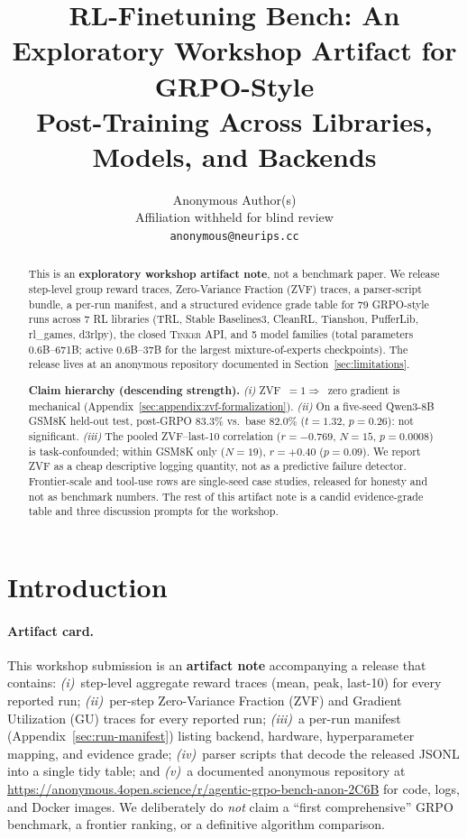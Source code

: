\documentclass{article}
\title{RL-Finetuning Bench: An Exploratory Workshop Artifact for GRPO-Style\\
Post-Training Across Libraries, Models, and Backends}
\author{Anonymous Author(s)\\
  Affiliation withheld for blind review\\
  \texttt{anonymous@neurips.cc}}
\newcommand{\tinker}{\textsc{Tinker}}
\begin{document}
\sloppy
{}
\hfuzz=2pt

\maketitle

\begin{abstract}
This is an \textbf{exploratory workshop artifact note}, not a benchmark paper.
We release step-level group reward traces, Zero-Variance Fraction (ZVF)
traces, a parser-script bundle, a per-run manifest, and a structured evidence
grade table for 79 GRPO-style runs across 7 RL libraries (TRL, Stable
Baselines3, CleanRL, Tianshou, PufferLib, rl\_games, d3rlpy), the closed
\tinker{} API, and 5 model families (total parameters 0.6B--671B; active
0.6B--37B for the largest mixture-of-experts checkpoints). The release lives
at an anonymous repository documented in
Section~\ref{sec:limitations}.

\textbf{Claim hierarchy (descending strength).}
\textit{(i)} ZVF~$=1\Rightarrow$~zero gradient is mechanical
(Appendix~\ref{sec:appendix:zvf-formalization}).
\textit{(ii)} On a five-seed Qwen3-8B GSM8K held-out test, post-GRPO
$83.3\%$ vs.\ base $82.0\%$ ($t{=}1.32$, $p{=}0.26$): not significant.
\textit{(iii)} The pooled ZVF--last-10 correlation
($r{=}{-}0.769$, $N{=}15$, $p{=}0.0008$) is task-confounded; within
GSM8K only ($N{=}19$), $r{=}{+}0.40$ ($p{=}0.09$).
We report ZVF as a cheap descriptive logging quantity, not as a
predictive failure detector. Frontier-scale and tool-use rows are
single-seed case studies, released for honesty and not as benchmark numbers.
The rest of this artifact note is a candid evidence-grade table and three
discussion prompts for the workshop.
\end{abstract}
 \section{Introduction}
\label{sec:intro}

\paragraph{Artifact card.}
This workshop submission is an \textbf{artifact note} accompanying a release
that contains: \textit{(i)}~step-level aggregate reward traces (mean, peak,
last-10) for every reported run; \textit{(ii)}~per-step Zero-Variance
Fraction (ZVF) and Gradient Utilization (GU) traces for every reported run;
\textit{(iii)}~a per-run manifest (Appendix~\ref{sec:run-manifest}) listing
backend, hardware, hyperparameter mapping, and evidence grade;
\textit{(iv)}~parser scripts that decode the released JSONL into a single
tidy table; and \textit{(v)}~a documented anonymous repository at
\url{https://anonymous.4open.science/r/agentic-grpo-bench-anon-2C6B} for
code, logs, and Docker images. We deliberately do \emph{not} claim a
``first comprehensive'' GRPO benchmark, a frontier ranking, or a definitive
algorithm comparison.
\end{document}
